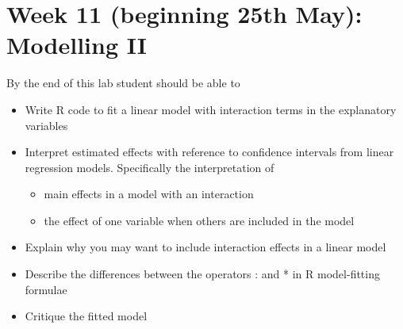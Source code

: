 \documentclass{article}
\begin{document}
\section*{Week 11 (beginning 25th May): Modelling II}
By the end of this lab student should be able to
\begin{itemize}
\item Write R code to fit a linear model with interaction terms in the explanatory variables
\item Interpret estimated effects with reference to confidence intervals from linear regression models. Specifically the interpretation of
  \begin{itemize}
  \item main effects in a model with an interaction
  \item the effect of one variable when others are included in the model
  \end{itemize}
\item Explain why you may want to include interaction effects in a linear model
\item Describe the differences between the operators : and * in R model-fitting formulae
\item Critique the fitted model
\end{itemize}
\end{document}

